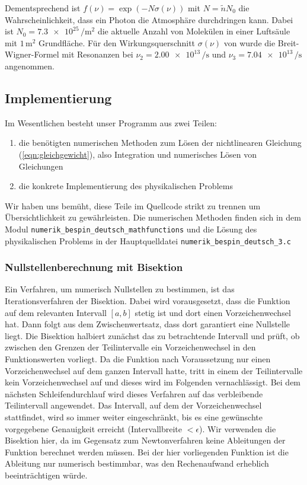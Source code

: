 \documentclass[10pt,a4paper]{article}
\begin{document}
Dementsprechend ist $f(\nu) = \exp\left(-N \sigma(\nu) \right)$ mit $N = \tilde{n} N_0$ die Wahrscheinlichkeit, dass ein Photon die Atmosphäre durchdringen kann. Dabei ist $N_0 = \num{7.3e25}\,\si{\per\metre^2}$ die aktuelle Anzahl von  Molekülen in einer Luftsäule mit $\num{1}\,\si{\metre^2}$ Grundfläche. Für den Wirkungsquerschnitt $\sigma(\nu)$ von  wurde die Breit-Wigner-Formel mit Resonanzen bei $\nu_2 = \num{2.00e13}\, \si{\per\second}$ und $\nu_3 = \num{7.04e13}\, \si{\per\second}$ angenommen.


\subsection{Implementierung}
Im Wesentlichen besteht unser Programm aus zwei Teilen:
\begin{enumerate}
	\item die benötigten numerischen Methoden zum Lösen der nichtlinearen Gleichung (\ref{eqn:gleichgewicht}), also Integration und numerisches Lösen von Gleichungen
	\item die konkrete Implementierung des physikalischen Problems
\end{enumerate}
Wir haben uns bemüht, diese Teile im Quellcode strikt zu trennen um Übersichtlichkeit zu gewährleisten. Die numerischen Methoden finden sich in dem Modul \texttt{numerik\_bespin\_deutsch\_mathfunctions} und die Lösung des physikalischen Problems in der Hauptquelldatei \texttt{numerik\_bespin\_deutsch\_3.c}

\subsubsection{Nullstellenberechnung mit Bisektion}

Ein Verfahren, um numerisch Nullstellen zu bestimmen, ist das Iterationsverfahren der Bisektion. Dabei wird vorausgesetzt, dass die Funktion auf dem relevanten Intervall $[a,b]$ stetig ist und dort einen Vorzeichenwechsel hat. Dann folgt aus dem Zwischenwertsatz, dass dort garantiert eine Nullstelle liegt. Die Bisektion halbiert zunächst das zu betrachtende Intervall und prüft, ob zwischen den Grenzen der Teilintervalle ein Vorzeichenwechsel in den Funktionswerten vorliegt. Da die Funktion nach Voraussetzung nur einen Vorzeichenwechsel auf dem ganzen Intervall hatte, tritt in einem der Teilintervalle kein Vorzeichenwechsel auf und dieses wird im Folgenden vernachlässigt. Bei dem nächsten Schleifendurchlauf wird dieses Verfahren auf das verbleibende Teilintervall angewendet. Das Intervall, auf dem der Vorzeichenwechsel stattfindet, wird so immer weiter eingeschränkt, bis es eine gewünschte vorgegebene Genauigkeit erreicht (Intervallbreite $<\epsilon$). 
Wir verwenden die Bisektion hier, da im Gegensatz zum Newtonverfahren keine Ableitungen der Funktion  berechnet werden müssen. Bei der hier vorliegenden Funktion ist die Ableitung nur numerisch bestimmbar, was den Rechenaufwand erheblich beeinträchtigen würde.
\end{document}
